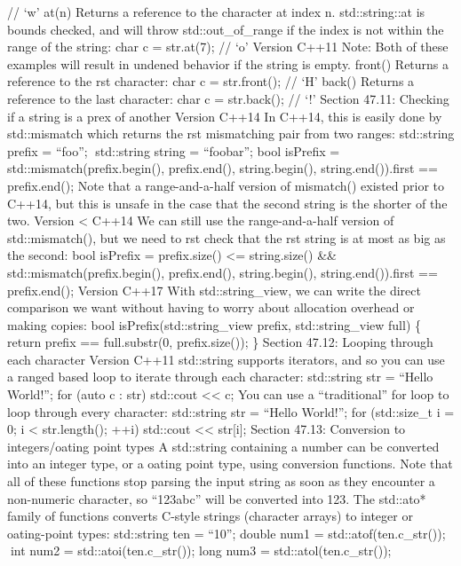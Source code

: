 // `w' at(n) Returns a reference to the character at index n.
std::string::at is bounds checked, and will throw std::out\_of\_range if
the index is not within the range of the string: char c = str.at(7); //
`o' Version C++11 Note: Both of these examples will result in undened
behavior if the string is empty. front() Returns a reference to the rst
character: char c = str.front(); // `H' back() Returns a reference to
the last character: char c = str.back(); // `!' Section 47.11: Checking
if a string is a prex of another Version C++14 In C++14, this is easily
done by std::mismatch which returns the rst mismatching pair from two
ranges: std::string prefix = ``foo''; std::string string = ``foobar'';
bool isPrefix = std::mismatch(prefix.begin(), prefix.end(),
string.begin(), string.end()).first == prefix.end(); Note that a
range-and-a-half version of mismatch() existed prior to C++14, but this
is unsafe in the case that the second string is the shorter of the two.
Version \textless{} C++14 We can still use the range-and-a-half version
of std::mismatch(), but we need to rst check that the rst string is at
most as big as the second: bool isPrefix = prefix.size() \textless=
string.size() \&\& std::mismatch(prefix.begin(), prefix.end(),
string.begin(), string.end()).first == prefix.end(); Version C++17 With
std::string\_view, we can write the direct comparison we want without
having to worry about allocation overhead or making copies: bool
isPrefix(std::string\_view prefix, std::string\_view full) \{ return
prefix == full.substr(0, prefix.size()); \} Section 47.12: Looping
through each character Version C++11 std::string supports iterators, and
so you can use a ranged based loop to iterate through each character:
std::string str = ``Hello World!''; for (auto c : str) std::cout
\textless\textless{} c; You can use a ``traditional'' for loop to loop
through every character: std::string str = ``Hello World!''; for
(std::size\_t i = 0; i \textless{} str.length(); ++i) std::cout
\textless\textless{} str{[}i{]}; Section 47.13: Conversion to
integers/oating point types A std::string containing a number can be
converted into an integer type, or a oating point type, using conversion
functions. Note that all of these functions stop parsing the input
string as soon as they encounter a non-numeric character, so ``123abc''
will be converted into 123. The std::ato* family of functions converts
C-style strings (character arrays) to integer or oating-point types:
std::string ten = ``10''; double num1 = std::atof(ten.c\_str()); int
num2 = std::atoi(ten.c\_str()); long num3 = std::atol(ten.c\_str());
